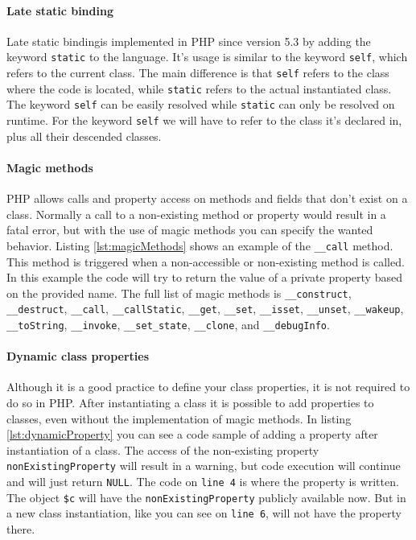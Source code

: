 \documentclass[../main.tex]{subfiles}
\begin{document}
    \paragraph{Late static binding}
    Late static binding\footnotemark is implemented in PHP since version 5.3 by adding the keyword \texttt{static} to the language.
    It's usage is similar to the keyword \texttt{self}, which refers to the current class. 
    The main difference is that \texttt{self} refers to the class where the code is located, while \texttt{static} refers to the actual instantiated class.
    The keyword \texttt{self} can be easily resolved while \texttt{static} can only be resolved on runtime.
    For the keyword \texttt{self} we will have to refer to the class it's declared in, plus all their descended classes.
    
    \paragraph{Magic methods}
    PHP allows calls and property access on methods and fields that don't exist on a class.
    Normally a call to a non-existing method or property would result in a fatal error, but with the use of magic methods you can specify the wanted behavior.
    Listing \ref{lst:magicMethods} shows an example of the \texttt{\_\_{}call} method.
    This method is triggered when a non-accessible or non-existing method is called.
    In this example the code will try to return the value of a private property based on the provided name.
    The full list of magic methods is \texttt{\_\_{}construct}, \texttt{\_\_{}destruct}, \texttt{\_\_{}call}, \texttt{\_\_{}callStatic}, \texttt{\_\_{}get}, \texttt{\_\_{}set}, \texttt{\_\_{}isset}, \texttt{\_\_{}unset}, \texttt{\_\_{}wakeup}, \texttt{\_\_{}toString}, \texttt{\_\_{}invoke}, \texttt{\_\_{}set\_state}, \texttt{\_\_{}clone}, and \texttt{\_\_{}debugInfo}.
	
	

    \paragraph{Dynamic class properties}
    Although it is a good practice to define your class properties, it is not required to do so in PHP.
    After instantiating a class it is possible to add properties to classes, even without the implementation of magic methods.
    In listing \ref{lst:dynamicProperty} you can see a code sample of adding a property after instantiation of a class.
    The access of the non-existing property \texttt{nonExistingProperty} will result in a warning, but code execution will continue and will just return \texttt{NULL}.
    The code on \texttt{line 4} is where the property is written.
    The object \texttt{\$c} will have the \texttt{nonExistingProperty} publicly available now.
    But in a new class instantiation, like you can see on \texttt{line 6}, will not have the property there.
    
\end{document}
